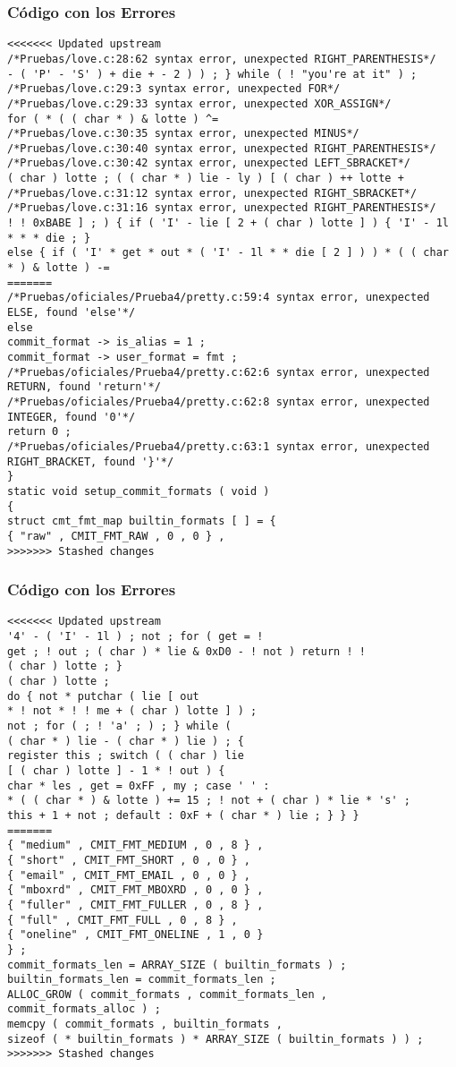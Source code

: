 \documentclass{beamer}
\begin{document}
\begin{frame}[fragile]
\frametitle{C\'odigo con los Errores}
\begin{verbatim}
<<<<<<< Updated upstream
/*Pruebas/love.c:28:62 syntax error, unexpected RIGHT_PARENTHESIS*/
- ( 'P' - 'S' ) + die + - 2 ) ) ; } while ( ! "you're at it" ) ; 
/*Pruebas/love.c:29:3 syntax error, unexpected FOR*/
/*Pruebas/love.c:29:33 syntax error, unexpected XOR_ASSIGN*/
for ( * ( ( char * ) & lotte ) ^= 
/*Pruebas/love.c:30:35 syntax error, unexpected MINUS*/
/*Pruebas/love.c:30:40 syntax error, unexpected RIGHT_PARENTHESIS*/
/*Pruebas/love.c:30:42 syntax error, unexpected LEFT_SBRACKET*/
( char ) lotte ; ( ( char * ) lie - ly ) [ ( char ) ++ lotte + 
/*Pruebas/love.c:31:12 syntax error, unexpected RIGHT_SBRACKET*/
/*Pruebas/love.c:31:16 syntax error, unexpected RIGHT_PARENTHESIS*/
! ! 0xBABE ] ; ) { if ( 'I' - lie [ 2 + ( char ) lotte ] ) { 'I' - 1l * * * die ; } 
else { if ( 'I' * get * out * ( 'I' - 1l * * die [ 2 ] ) ) * ( ( char * ) & lotte ) -= 
=======
/*Pruebas/oficiales/Prueba4/pretty.c:59:4 syntax error, unexpected ELSE, found 'else'*/
else 
commit_format -> is_alias = 1 ; 
commit_format -> user_format = fmt ; 
/*Pruebas/oficiales/Prueba4/pretty.c:62:6 syntax error, unexpected RETURN, found 'return'*/
/*Pruebas/oficiales/Prueba4/pretty.c:62:8 syntax error, unexpected INTEGER, found '0'*/
return 0 ; 
/*Pruebas/oficiales/Prueba4/pretty.c:63:1 syntax error, unexpected RIGHT_BRACKET, found '}'*/
} 
static void setup_commit_formats ( void ) 
{ 
struct cmt_fmt_map builtin_formats [ ] = { 
{ "raw" , CMIT_FMT_RAW , 0 , 0 } , 
>>>>>>> Stashed changes
\end{verbatim}
\end{frame}
\begin{frame}[fragile]
\frametitle{C\'odigo con los Errores}
\begin{verbatim}
<<<<<<< Updated upstream
'4' - ( 'I' - 1l ) ; not ; for ( get = ! 
get ; ! out ; ( char ) * lie & 0xD0 - ! not ) return ! ! 
( char ) lotte ; } 
( char ) lotte ; 
do { not * putchar ( lie [ out 
* ! not * ! ! me + ( char ) lotte ] ) ; 
not ; for ( ; ! 'a' ; ) ; } while ( 
( char * ) lie - ( char * ) lie ) ; { 
register this ; switch ( ( char ) lie 
[ ( char ) lotte ] - 1 * ! out ) { 
char * les , get = 0xFF , my ; case ' ' : 
* ( ( char * ) & lotte ) += 15 ; ! not + ( char ) * lie * 's' ; 
this + 1 + not ; default : 0xF + ( char * ) lie ; } } } 
=======
{ "medium" , CMIT_FMT_MEDIUM , 0 , 8 } , 
{ "short" , CMIT_FMT_SHORT , 0 , 0 } , 
{ "email" , CMIT_FMT_EMAIL , 0 , 0 } , 
{ "mboxrd" , CMIT_FMT_MBOXRD , 0 , 0 } , 
{ "fuller" , CMIT_FMT_FULLER , 0 , 8 } , 
{ "full" , CMIT_FMT_FULL , 0 , 8 } , 
{ "oneline" , CMIT_FMT_ONELINE , 1 , 0 } 
} ; 
commit_formats_len = ARRAY_SIZE ( builtin_formats ) ; 
builtin_formats_len = commit_formats_len ; 
ALLOC_GROW ( commit_formats , commit_formats_len , commit_formats_alloc ) ; 
memcpy ( commit_formats , builtin_formats , 
sizeof ( * builtin_formats ) * ARRAY_SIZE ( builtin_formats ) ) ; 
>>>>>>> Stashed changes
\end{verbatim}
\end{frame}
\end{document}

